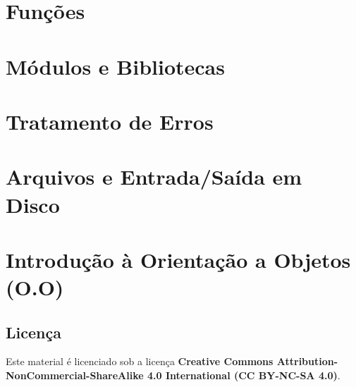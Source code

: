 \documentclass[12pt]{book}
\begin{document}
	\chapter{Funções}
	
	\chapter{Módulos e Bibliotecas}
	
	\chapter{Tratamento de Erros}
	
	\chapter{Arquivos e Entrada/Saída em Disco}
	
	\chapter{Introdução à Orientação a Objetos (O.O)}
	
	
	
	\newpage
	\section*{Licença \faCreativeCommons}
	
	Este material é licenciado sob a licença \textbf{Creative Commons Attribution-NonCommercial-ShareAlike 4.0 International (CC BY-NC-SA 4.0)}.
	
\end{document}
